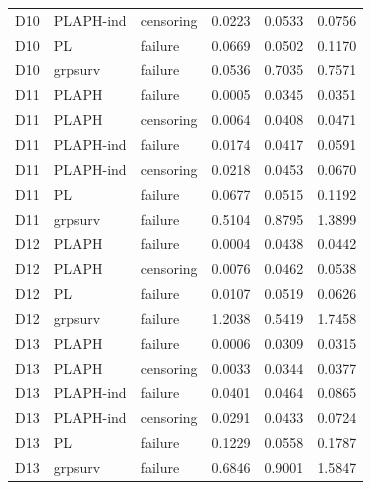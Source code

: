 \begin{longtable}{cllrrr}
D10 & PLAPH-ind & censoring & 0.0223 & 0.0533 & 0.0756 \\
D10 & PL & failure & 0.0669 & 0.0502 & 0.1170 \\
D10 & grpsurv & failure & 0.0536 & 0.7035 & 0.7571 \\
D11 & PLAPH & failure & 0.0005 & 0.0345 & 0.0351 \\
D11 & PLAPH & censoring & 0.0064 & 0.0408 & 0.0471 \\
D11 & PLAPH-ind & failure & 0.0174 & 0.0417 & 0.0591 \\
D11 & PLAPH-ind & censoring & 0.0218 & 0.0453 & 0.0670 \\
D11 & PL & failure & 0.0677 & 0.0515 & 0.1192 \\
D11 & grpsurv & failure & 0.5104 & 0.8795 & 1.3899 \\
D12 & PLAPH & failure & 0.0004 & 0.0438 & 0.0442 \\
D12 & PLAPH & censoring & 0.0076 & 0.0462 & 0.0538 \\
D12 & PL & failure & 0.0107 & 0.0519 & 0.0626 \\
D12 & grpsurv & failure & 1.2038 & 0.5419 & 1.7458 \\
D13 & PLAPH & failure & 0.0006 & 0.0309 & 0.0315 \\
D13 & PLAPH & censoring & 0.0033 & 0.0344 & 0.0377 \\
D13 & PLAPH-ind & failure & 0.0401 & 0.0464 & 0.0865 \\
D13 & PLAPH-ind & censoring & 0.0291 & 0.0433 & 0.0724 \\
D13 & PL & failure & 0.1229 & 0.0558 & 0.1787 \\
D13 & grpsurv & failure & 0.6846 & 0.9001 & 1.5847 \\
\end{longtable}

